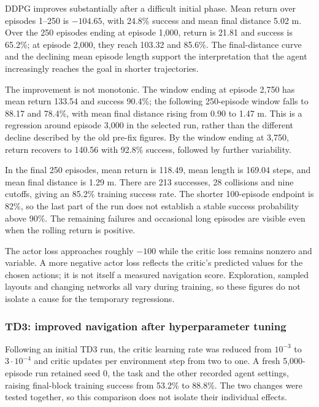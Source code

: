 \documentclass[11pt,a4paper]{article}
\theoremstyle{definition}
\theoremstyle{plain}
\theoremstyle{remark}
\begin{document}
DDPG improves substantially after a difficult initial phase. Mean return over episodes 1--250 is $-104.65$, with 24.8\% success and mean final distance 5.02 m. Over the 250 episodes ending at episode 1,000, return is 21.81 and success is 65.2\%; at episode 2,000, they reach 103.32 and 85.6\%. The final-distance curve and the declining mean episode length support the interpretation that the agent increasingly reaches the goal in shorter trajectories.

The improvement is not monotonic. The window ending at episode 2,750 has mean return 133.54 and success 90.4\%; the following 250-episode window falls to 88.17 and 78.4\%, with mean final distance rising from 0.90 to 1.47 m. This is a regression around episode 3,000 in the selected run, rather than the different decline described by the old pre-fix figures. By the window ending at 3,750, return recovers to 140.56 with 92.8\% success, followed by further variability.

In the final 250 episodes, mean return is 118.49, mean length is 169.04 steps, and mean final distance is 1.29 m. There are 213 successes, 28 collisions and nine cutoffs, giving an 85.2\% training success rate. The shorter 100-episode endpoint is 82\%, so the last part of the run does not establish a stable success probability above 90\%. The remaining failures and occasional long episodes are visible even when the rolling return is positive.

The actor loss approaches roughly $-100$ while the critic loss remains nonzero and variable. A more negative actor loss reflects the critic's predicted values for the chosen actions; it is not itself a measured navigation score. Exploration, sampled layouts and changing networks all vary during training, so these figures do not isolate a cause for the temporary regressions.
\FloatBarrier

\subsubsection{TD3: improved navigation after hyperparameter tuning}

Following an initial TD3 run, the critic learning rate was reduced from $10^{-3}$ to $3\cdot10^{-4}$ and critic updates per environment step from two to one. A fresh 5,000-episode run retained seed 0, the task and the other recorded agent settings, raising final-block training success from 53.2\% to 88.8\%. The two changes were tested together, so this comparison does not isolate their individual effects.
\end{document}
